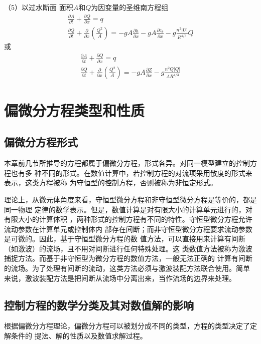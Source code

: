 （5）以过水断面
面积$A$和$Q$为因变量的圣维南方程组
\begin{equation}
  \begin{gathered}
    \frac{\partial A}{\partial t}
    +
    \frac{\partial Q}{\partial x}
    =
    q
    \\
    \frac{\partial Q}{\partial t}
    +
    \frac{\partial}{\partial x}\left(\frac{Q^{2}}{A}\right)
    =
    -gA\frac{\partial h}{\partial x}
    -gA\frac{\partial z_{b}}{\partial x}
    -g\frac{n^{2}|U|}{R^{4/3}}Q
  \end{gathered}
  \label{EqCGe_SV_AQ_1}
\end{equation}
或
\begin{equation}
  \begin{gathered}
    \frac{\partial A}{\partial t}
    +
    \frac{\partial Q}{\partial x}
    =
    q
    \\
    \frac{\partial Q}{\partial t}
    +
    \frac{\partial}{\partial x}\left(\frac{Q^{2}}{A}\right)
    =
    -
    gA\frac{\partial Z}{\partial x}
    -
    g\frac{n^{2}Q|Q|}{AR^{4/3}}
  \end{gathered}
  \label{EqCGe_SV_AQ_2}
\end{equation}

\section{偏微分方程类型和性质}
\subsection{偏微分方程形式}
本章前几节所推导的方程都属于偏微分方程，形式各异。对同一模型建立的控制方程也有多
种不同的形式。在数值计算中，若控制方程的对流项采用散度的形式来表示，这类方程被称
为守恒型的控制方程，否则被称为非恒定形式。

理论上，从微元体角度来看，守恒型微分方程和非守恒型微分方程是等价的，都是同一物理
定律的数学表示。但是，数值计算是对有限大小的计算单元进行的，对有限大小的计算体积
，两种形式的控制方程有不同的特性。守恒型微分方程允许流动参数在计算单元或控制体内
部存在间断；而非守恒型微分方程要求流动参数是可微的。因此，基于守恒型微分方程的数
值方法，可以直接用来计算有间断（如激波）的流场，且不用对间断进行任何特殊处理。这
类数值方法被称为激波捕捉方法。而基于非守恒型为微分方程的数值方法，一般无法正确的
计算有间断的流场。为了处理有间断的流动，这类方法必须与激波装配方法联合使用。简单
来说，激波装配方法是把间断从流场中分离出来，当作流场的边界来处理。

\subsection{控制方程的数学分类及其对数值解的影响}
根据偏微分方程理论，偏微分方程可以被划分成不同的类型，方程的类型决定了定解条件的
提法、解的性质以及数值求解过程。

